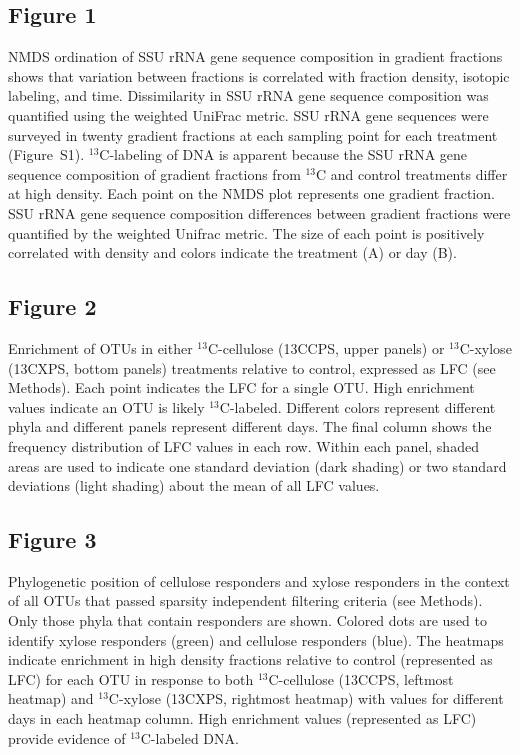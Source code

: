 \subsection{Figure 1}
NMDS ordination of SSU rRNA gene sequence composition in
gradient fractions shows that variation between fractions is
correlated with fraction density, isotopic labeling, and
time. Dissimilarity in SSU rRNA gene sequence composition was quantified using the 
weighted UniFrac metric. SSU rRNA gene sequences were surveyed in twenty
gradient fractions at each sampling point for each treatment (Figure~S1).
$^{13}$C-labeling of DNA is apparent because the SSU rRNA gene sequence composition of
gradient fractions from $^{13}$C and control treatments differ at high density.
Each point on the NMDS plot represents one gradient fraction.  SSU rRNA gene sequence
composition differences between gradient fractions were quantified by the
weighted Unifrac metric. The size of each point is positively correlated with
density and colors indicate the treatment (A) or day (B).
\subsection{Figure 2}
Enrichment of OTUs in either $^{13}$C-cellulose (13CCPS, upper panels) or
$^{13}$C-xylose (13CXPS, bottom panels) treatments relative to control,
expressed as LFC (see Methods). Each point indicates the LFC for a single OTU.
High enrichment values indicate an OTU is likely $^{13}$C-labeled. Different
colors represent different phyla and different panels represent different days.
The final column shows the frequency distribution of LFC values in each row.
Within each panel, shaded areas are used to indicate one standard deviation
(dark shading) or two standard deviations (light shading) about the mean of all
LFC values.
\subsection{Figure 3}
Phylogenetic position of cellulose responders and xylose responders in the
context of all OTUs that passed sparsity independent filtering criteria (see
Methods). Only those phyla that contain responders are shown.  Colored dots are
used to identify xylose responders (green) and cellulose responders (blue). The
heatmaps indicate enrichment in high density fractions relative to control
(represented as LFC) for each OTU in response to both $^{13}$C-cellulose
(13CCPS, leftmost heatmap) and $^{13}$C-xylose (13CXPS, rightmost heatmap) with
values for different days in each heatmap column. High enrichment values
(represented as LFC) provide evidence of $^{13}$C-labeled DNA.  


